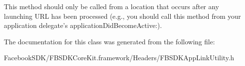 This method should only be called from a location that occurs after any launching U\-R\-L has been processed (e.\-g., you should call this method from your application delegate's application\-Did\-Become\-Active\-:). 

The documentation for this class was generated from the following file\-:\begin{DoxyCompactItemize}
\item 
Facebook\-S\-D\-K/\-F\-B\-S\-D\-K\-Core\-Kit.\-framework/\-Headers/F\-B\-S\-D\-K\-App\-Link\-Utility.\-h\end{DoxyCompactItemize}
